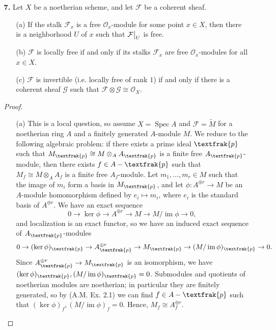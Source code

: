 \documentclass{article}
\newcommand{\goth}[1]{\textfrak{#1}}
\newcommand{\fF}{\mathcal{F}}
\newcommand{\fG}{\mathcal{G}}
\newcommand{\fO}{\mathcal{O}}
\DeclareMathOperator{\im}{im}
\DeclareMathOperator{\spec}{Spec}
\newcommand\restr[2]{{%
  \left.\kern-\nulldelimiterspace %
  #1 %
  \vphantom{\big|} %
  \right|_{#2} %
}}
\begin{document}
\begin{enumerate} [label=\textbf{\arabic*.}, leftmargin=0em]
\item[\textbf{7.}] Let $X$ be a noetherian scheme, and let $\fF$ be a coherent sheaf.
\begin{itemize} [leftmargin=0em]
    \item[(a)] If the stalk $\fF_x$ is a free $\fO_x$-module for some point $x \in X$, then there is a neighborhood $U$ of $x$ such that $\restr{\fF}{U}$ is free.
    \item[(b)] $\fF$ is locally free if and only if its stalks $\fF_x$ are free $\fO_x$-modules for all $x \in X$.
    \item[(c)] $\fF$ is invertible (i.e. locally free of rank $1$) if and only if there is a coherent sheaf $\fG$ such that $\fF \otimes \fG \cong \fO_X$.
\end{itemize}

\begin{proof} $ $ \vspace{0pt}
    \begin{itemize}[leftmargin=0em]
        \item[(a)] This is a local question, so assume $X = \spec{A}$ and $\fF = \tilde{M}$ for a noetherian ring $A$ and a finitely generated $A$-module $M$. We reduce to the following algebraic problem: if there exists a prime ideal $\goth{p}$ such that $M_\goth{p} \cong M \otimes_A A_\goth{p}$ is a finite free $A_\goth{p}$-module, then there exists $f \in A - \goth{p}$ such that $M_{f} \cong M \otimes_A A_f$ is a finite free $A_f$-module. Let $m_1, \dots, m_r \in M$ such that the image of $m_i$ form a basis in $M_{\goth{p}}$, and let $\phi : A^{\oplus r} \to M$ be an $A$-module homomorphism defined by $e_i \mapsto m_i$, where $e_i$ is the standard basis of $A^{\oplus r}$. We have an exact sequence
        \begin{equation*}
            0 \to \ker{\phi} \to A^{\oplus r} \to M \to M / \im{\phi} \to 0,
        \end{equation*}
        and localization is an exact functor, so we have an induced exact sequence of $A_\goth{p}$-modules
        \begin{equation*}
            0 \to (\ker{\phi})_\goth{p} \to A_\goth{p}^{\oplus r} \to M_\goth{p} \to (M / \im{\phi})_\goth{p} \to 0.
        \end{equation*}
        Since $A_\goth{p}^{\oplus r} \to M_\goth{p}$ is an isomorphism, we have $(\ker{\phi})_\goth{p}, (M / \im{\phi})_\goth{p} = 0$. Submodules and quotients of noetherian modules are noetherian; in particular they are finitely generated, so by (A.M. Ex. 2.1) we can find $f \in A - \goth{p}$ such that $(\ker{\phi})_f, (M / \im{\phi})_f = 0$. Hence, $M_f \cong A_f^{\oplus r}$.


\end{itemize}
\end{proof}
\end{enumerate}
\end{document}
